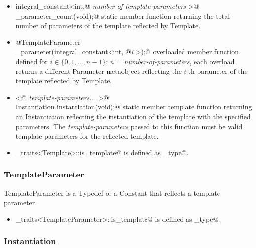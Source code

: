 \begin{itemize}

	\item{\verb@static integral_constant<int,@ {\em number-of-template-parameters}
	\verb@>@\\\verb@template_parameter_count(void);@} static member function returning the total number
	of parameters of the template reflected by {\metaobject Template}.

	\item{\verb@static @{\metaobject TemplateParameter}\\\verb@template_parameter(integral_constant<int, @{\em i}
	\verb@>);@} overloaded member function defined
	for $i \in \{0, 1, \dots, n-1\}$; {\em n = number-of-parameters},
	each overload returns a different {\metaobject Parameter} metaobject reflecting the {\em i}-th parameter
	of the template reflected by {\metaobject Template}.

	\item{\verb@template <@ {\em template-parameters...} \verb@>@\\
	\verb@static Instantiation instantiation(void);@} static member template function returning an {\metaobject Instantiation}
	reflecting the instantiation of the template with the specified parameters. The {\em template-parameters} passed
	to this function must be valid template parameters for the reflected template.

	\item \verb@metaobject_traits<Template>::is_template@ is defined as \verb@true_type@.
\end{itemize}

\subsubsection{TemplateParameter}

{\metaobject TemplateParameter} is a {\metaobject Typedef} or a {\metaobject Constant} that
reflects a template parameter. 

\begin{itemize}
	\item \verb@metaobject_traits<TemplateParameter>::is_template@ is defined as \verb@true_type@.
\end{itemize}

\subsubsection{Instantiation}

